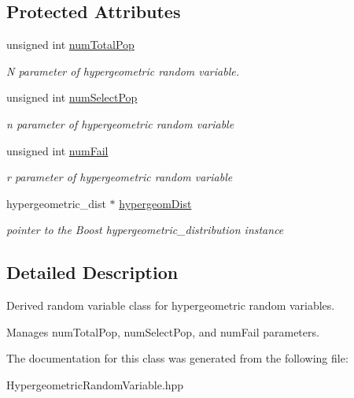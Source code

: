 \subsection*{Protected Attributes}
\begin{DoxyCompactItemize}
\item 
unsigned int \hyperlink{classPecos_1_1HypergeometricRandomVariable_a248689a7f4ef45f8be7d47d6e3fe142f}{num\+Total\+Pop}\label{classPecos_1_1HypergeometricRandomVariable_a248689a7f4ef45f8be7d47d6e3fe142f}

\begin{DoxyCompactList}\small\item\em N parameter of hypergeometric random variable. \end{DoxyCompactList}\item 
unsigned int \hyperlink{classPecos_1_1HypergeometricRandomVariable_ab382104add8d274e7e7d27561f38a33a}{num\+Select\+Pop}\label{classPecos_1_1HypergeometricRandomVariable_ab382104add8d274e7e7d27561f38a33a}

\begin{DoxyCompactList}\small\item\em n parameter of hypergeometric random variable \end{DoxyCompactList}\item 
unsigned int \hyperlink{classPecos_1_1HypergeometricRandomVariable_a03eaaa9ed47767dd148b221ca4d72b76}{num\+Fail}\label{classPecos_1_1HypergeometricRandomVariable_a03eaaa9ed47767dd148b221ca4d72b76}

\begin{DoxyCompactList}\small\item\em r parameter of hypergeometric random variable \end{DoxyCompactList}\item 
hypergeometric\+\_\+dist $\ast$ \hyperlink{classPecos_1_1HypergeometricRandomVariable_a7a89ee348e50ca9eb7545b5c9fe9f441}{hypergeom\+Dist}\label{classPecos_1_1HypergeometricRandomVariable_a7a89ee348e50ca9eb7545b5c9fe9f441}

\begin{DoxyCompactList}\small\item\em pointer to the Boost hypergeometric\+\_\+distribution instance \end{DoxyCompactList}\end{DoxyCompactItemize}


\subsection{Detailed Description}
Derived random variable class for hypergeometric random variables. 

Manages num\+Total\+Pop, num\+Select\+Pop, and num\+Fail parameters. 

The documentation for this class was generated from the following file\+:\begin{DoxyCompactItemize}
\item 
Hypergeometric\+Random\+Variable.\+hpp\end{DoxyCompactItemize}
